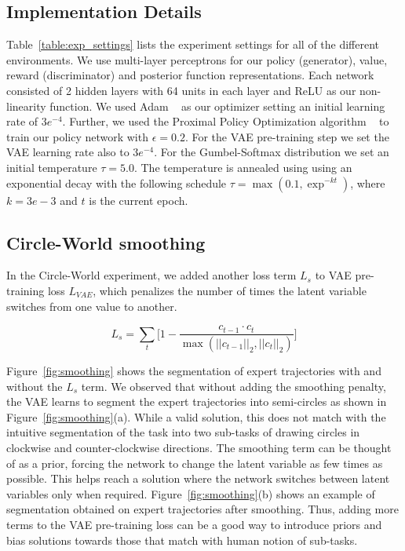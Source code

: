 \documentclass{article} %
\begin{document}
\subsection{Implementation Details}
Table~\ref{table:exp_settings} lists the experiment settings for all of the different environments. 
We use multi-layer perceptrons for our policy (generator), value, reward (discriminator) and posterior function representations. Each network consisted of 2 hidden layers with 64 units in each layer and ReLU as our non-linearity function. We used Adam ~\citep{kingma2014adam} as our optimizer setting an initial learning rate of $3e^{-4}$. 
Further, we used the Proximal Policy Optimization algorithm ~\citep{schulman2017proximal} to train our policy network with $\epsilon = 0.2$.
For the VAE pre-training step we set the VAE learning rate also to $3e^{-4}$. For the Gumbel-Softmax distribution we set an initial temperature $\tau = 5.0$. The temperature is annealed using using an exponential decay with the following schedule $\tau = \max(0.1, \exp^{-kt})$, where $k = 3e-3$ and $t$ is the current epoch.


\subsection{Circle-World smoothing}

In the Circle-World experiment, we added another loss term $L_s$ to VAE pre-training loss $L_{VAE}$, which penalizes the number of times the latent variable switches from one value to another.

\begin{equation*}
    L_{s} = \sum_t \Big[ 1 - \frac{c_{t-1} \cdot c_{t}}{\max (||c_{t-1}||_2, ||c_{t}||_2)} \Big]
\end{equation*}

Figure~\ref{fig:smoothing} shows the segmentation of expert trajectories with and without the $L_s$ term. We observed that without adding the smoothing penalty, the VAE learns to segment the expert trajectories into semi-circles as shown in Figure~\ref{fig:smoothing}(a). While a valid solution, this does not match with the intuitive segmentation of the task into two sub-tasks of drawing circles in clockwise and counter-clockwise directions. The smoothing term can be thought of as a prior, forcing the network to change the latent variable as few times as possible. This helps reach a solution where the network switches between latent variables only when required. Figure~\ref{fig:smoothing}(b) shows an example of segmentation obtained on expert trajectories after smoothing. Thus, adding more terms to the VAE pre-training loss can be a good way to introduce priors and bias solutions towards those that match with human notion of sub-tasks.
\end{document}
